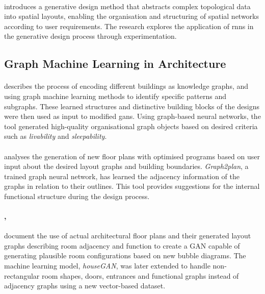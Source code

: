 \documentclass[a4paper, 12pt]{report}
\begin{document}
\paragraph{\cite{zidong2021topological}} introduces a generative design method that abstracts complex topological data into spatial layouts, enabling the organisation and structuring of spatial networks according to user requirements. The research explores the application of \acrlong{rnns} in the generative design process through experimentation.

\subsection*{Graph Machine Learning in Architecture}\label{subsec:graph-machine-learning-in-architecture-fr}

\paragraph{\cite{as2018artificial}} describes the process of encoding different buildings as \glspl{knowledge graph}, and using graph machine learning methods to identify specific patterns and subgraphs. These learned structures and distinctive building blocks of the designs were then used as input to modified \acrshort{gans}. Using graph-based neural networks, the tool generated high-quality organisational graph objects based on desired criteria such as \textit{livability} and \textit{sleepability}.

\paragraph{\cite{hu2020graph2plan}} analyses the generation of new floor plans with optimised programs based on user input about the desired layout graphs and building boundaries. \textit{Graph2plan}, a trained graph neural network, has learned the adjacency information of the graphs in relation to their outlines. This tool provides suggestions for the internal functional structure during the design process.

\paragraph{\cite{nauata2020house}, } document the use of actual architectural floor plans and their generated layout graphs describing room adjacency and function to create a GAN capable of generating plausible room configurations based on new bubble diagrams. The machine learning model, \textit{houseGAN}, was later extended to handle non-rectangular room shapes, doors, entrances and functional graphs instead of adjacency graphs using a new vector-based dataset.
\end{document}
